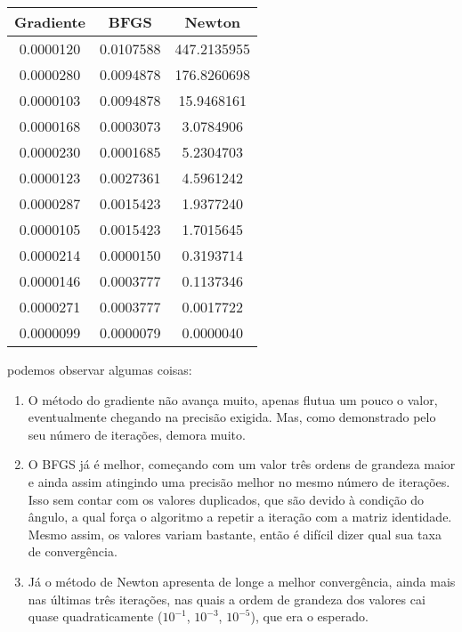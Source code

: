 \documentclass[a4paper,11pt]{article}
\begin{document}
            \begin{table}[h]
                \centering
                \begin{tabular}{ccc}
                    Gradiente & BFGS & Newton \\
                    \hline
                    0.0000120 & 0.0107588 & 447.2135955 \\
                    0.0000280 & 0.0094878 & 176.8260698 \\
                    0.0000103 & 0.0094878 & 15.9468161 \\
                    0.0000168 & 0.0003073 & 3.0784906 \\
                    0.0000230 & 0.0001685 & 5.2304703 \\
                    0.0000123 & 0.0027361 & 4.5961242 \\
                    0.0000287 & 0.0015423 & 1.9377240 \\
                    0.0000105 & 0.0015423 & 1.7015645 \\
                    0.0000214 & 0.0000150 & 0.3193714 \\
                    0.0000146 & 0.0003777 & 0.1137346 \\
                    0.0000271 & 0.0003777 & 0.0017722 \\
                    0.0000099 & 0.0000079 & 0.0000040
                \end{tabular}
            \end{table}

            \newpage
            podemos observar algumas coisas:
            \begin{enumerate}
                \item O método do gradiente não avança muito, apenas flutua um pouco o valor, eventualmente chegando na precisão exigida. Mas, como demonstrado pelo seu número de iterações, demora muito.
                \item O BFGS já é melhor, começando com um valor três ordens de grandeza maior e ainda assim atingindo uma precisão melhor no mesmo número de iterações. Isso sem contar com os valores duplicados, que são devido à condição do ângulo, a qual força o algoritmo a repetir a iteração com a matriz identidade. Mesmo assim, os valores variam bastante, então é difícil dizer qual sua taxa de convergência.
                \item Já o método de Newton apresenta de longe a melhor convergência, ainda mais nas últimas três iterações, nas quais a ordem de grandeza dos valores cai quase quadraticamente ($10^{-1}$, $10^{-3}$, $10^{-5}$), que era o esperado.
            \end{enumerate}
\end{document}
